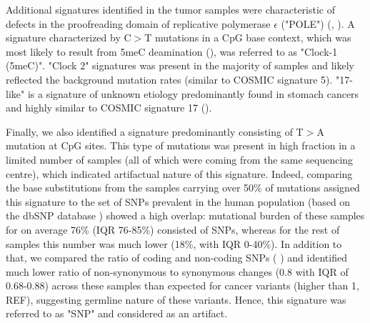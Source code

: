 Additional signatures identified in the tumor samples were characteristic of defects in the
proofreading domain of replicative polymerase $\epsilon$ ("POLE") (\cite{Alexandrov2013-md}, \cite{Shinbrot2014-js}). 
A signature characterized by C$>$T mutations in a CpG base context, which was most likely 
to result from 5meC deamination (\cite{Alexandrov2015-clock}), was referred to as "Clock-1 (5meC)". 
"Clock 2" signatures was present in the majority of samples and likely reflected the 
background mutation rates (similar to COSMIC signature 5). "17-like" is a signature 
of unknown etiology predominantly found in stomach cancers and highly similar to 
COSMIC signature 17 (\cite{Alexandrov2013-md}).

Finally, we also identified a signature predominantly consisting of T$>$A mutation at CpG sites.
This type of mutations was present in high fraction in a limited number of samples 
(all of which were coming from the same sequencing centre), which indicated artifactual
nature of this signature. Indeed, comparing the base substitutions from the samples
carrying over 50\% of mutations assigned this signature to the set of SNPs prevalent 
in the human population (based on the dbSNP database \cite{sherry2001dbsnp}) showed a high overlap: 
mutational burden of these samples for on average 76\% (IQR 76-85\%) consisted of SNPs, 
whereas for the rest of samples this number was much lower (18\%, with IQR 0-40\%). 
In addition to that, we compared the ratio of coding and non-coding SNPs (\cite{Consortium2015-kq} ) 
and identified much lower ratio of non-synonymous to synonymous changes (0.8 with IQR 
of 0.68-0.88) across these samples than expected for cancer variants (higher than 1, 
REF), suggesting germline nature of these variants. Hence, this signature 
was referred to as "SNP" and considered as an artifact.

